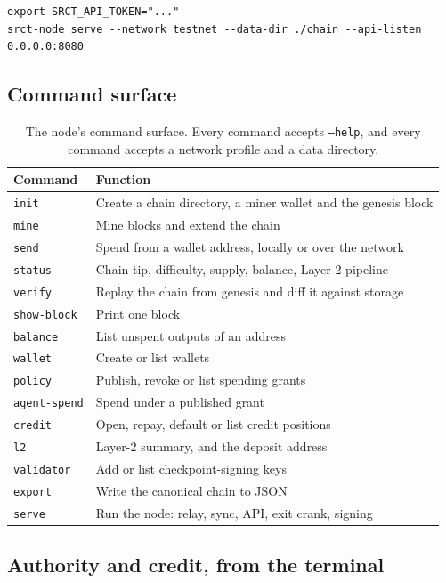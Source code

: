 \documentclass{article}
\begin{document}
\begin{verbatim}
export SRCT_API_TOKEN="..."
srct-node serve --network testnet --data-dir ./chain --api-listen 0.0.0.0:8080
\end{verbatim}

\subsection{Command surface}

\begin{table}[t]
\centering
\begin{tabular}{ll}
\toprule
\textbf{Command} & \textbf{Function} \\
\midrule
\texttt{init} & Create a chain directory, a miner wallet and the genesis block \\
\texttt{mine} & Mine blocks and extend the chain \\
\texttt{send} & Spend from a wallet address, locally or over the network \\
\texttt{status} & Chain tip, difficulty, supply, balance, Layer-2 pipeline \\
\texttt{verify} & Replay the chain from genesis and diff it against storage \\
\texttt{show-block} & Print one block \\
\texttt{balance} & List unspent outputs of an address \\
\texttt{wallet} & Create or list wallets \\
\texttt{policy} & Publish, revoke or list spending grants \\
\texttt{agent-spend} & Spend under a published grant \\
\texttt{credit} & Open, repay, default or list credit positions \\
\texttt{l2} & Layer-2 summary, and the deposit address \\
\texttt{validator} & Add or list checkpoint-signing keys \\
\texttt{export} & Write the canonical chain to JSON \\
\texttt{serve} & Run the node: relay, sync, API, exit crank, signing \\
\bottomrule
\end{tabular}
\caption{The node's command surface. Every command accepts \texttt{--help}, and
every command accepts a network profile and a data directory.}
\label{tab:cli}
\end{table}

\subsection{Authority and credit, from the terminal}
\end{document}
